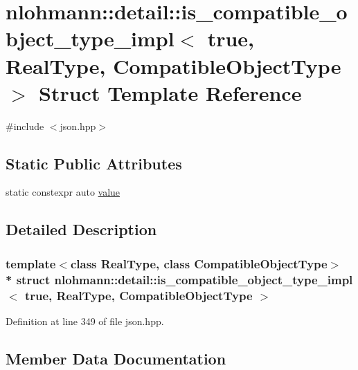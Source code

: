 \hypertarget{structnlohmann_1_1detail_1_1is__compatible__object__type__impl_3_01true_00_01_real_type_00_01_compatible_object_type_01_4}{}\section{nlohmann\+:\+:detail\+:\+:is\+\_\+compatible\+\_\+object\+\_\+type\+\_\+impl$<$ true, Real\+Type, Compatible\+Object\+Type $>$ Struct Template Reference}
\label{structnlohmann_1_1detail_1_1is__compatible__object__type__impl_3_01true_00_01_real_type_00_01_compatible_object_type_01_4}


{\ttfamily \#include $<$json.\+hpp$>$}

\subsection*{Static Public Attributes}
\begin{DoxyCompactItemize}
\item 
static constexpr auto \hyperlink{structnlohmann_1_1detail_1_1is__compatible__object__type__impl_3_01true_00_01_real_type_00_01_compatible_object_type_01_4_afa131fcd3a4fc1881dd350a04589e6cf}{value}
\end{DoxyCompactItemize}


\subsection{Detailed Description}
\subsubsection*{template$<$class Real\+Type, class Compatible\+Object\+Type$>$\\*
struct nlohmann\+::detail\+::is\+\_\+compatible\+\_\+object\+\_\+type\+\_\+impl$<$ true, Real\+Type, Compatible\+Object\+Type $>$}



Definition at line 349 of file json.\+hpp.



\subsection{Member Data Documentation}
